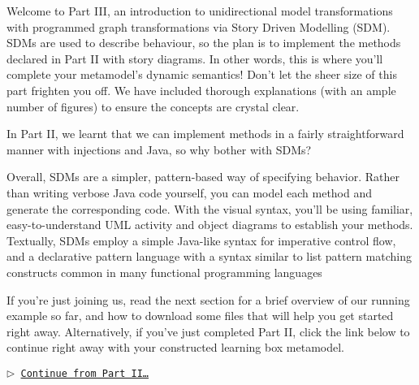\genHeader


\downloadLocation{\dlPartThree}

Welcome to Part III, an introduction to unidirectional model transformations with programmed graph transformations via Story Driven Modelling (SDM).
SDMs are used to describe behaviour, so the plan is to implement the methods declared in Part II with story diagrams. In other words,
this is where you'll complete your metamodel's dynamic semantics! Don't let the sheer size of this part frighten you off. We have included thorough
explanations (with an ample number of figures) to ensure the concepts are crystal clear.

In Part II, we learnt that we can implement methods in a fairly straightforward manner with injections and Java, so why bother with SDMs?

Overall, SDMs are a simpler, pattern-based way of specifying behavior. Rather than writing verbose Java code yourself, you can model each method and generate
the corresponding code. With the visual syntax, you'll be using familiar, easy-to-understand UML activity and object diagrams to establish your methods.
Textually, SDMs employ a simple Java-like syntax for imperative control flow, and a declarative pattern language with a syntax similar to list pattern matching
constructs common in many functional programming languages

If you're just joining us, read the next section for a brief overview of our running example so far, and how to download some files that will help you get
started right away. Alternatively, if you've just completed Part II, click the link below to continue right away with your constructed learning box metamodel.

\begin{center}\texttt{$\triangleright$ \hyperlink{explanation}{Continue from Part II\ldots}}\end{center}
